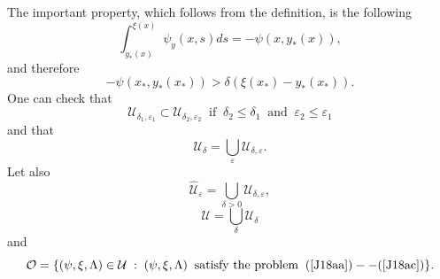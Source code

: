 \documentclass[a4paper,reqno,12pt]{amsart}
\theoremstyle{plain}
\theoremstyle{definition}
\numberwithin{equation}{section}
\begin{document}
\medskip
The important property, which follows from the definition, is the following
\begin{equation}\label{Jun14a}
\int_{y_*(x)}^{\xi(x)}\psi_y(x,s)ds=-\psi(x,y_*(x)),
\end{equation}
and therefore
\begin{equation}\label{Jun14aa}
-\psi(x_*,y_*(x_*))>\delta (\xi(x_*)-y_*(x_*)).
\end{equation}
One can check that
$$
{\mathcal U}_{\delta_1,\varepsilon_1}\subset {\mathcal U}_{\delta_2,\varepsilon_2}\;\;\mbox{if}\;\;\delta_2\leq \delta_1\;\;\mbox{and}\;\;\varepsilon_2\leq\varepsilon_1
$$
and that
\begin{equation}\label{Jun10b}
{\mathcal U}_\delta=\bigcup_\varepsilon {\mathcal U}_{\delta,\varepsilon}.
\end{equation}
Let also
$$
\widehat{\mathcal U}_{\varepsilon}=\bigcup_{\delta>0}{\mathcal U}_{\delta,\varepsilon},
$$
\begin{equation}\label{A30b}
{\mathcal U}=\bigcup_\delta {\mathcal U}_\delta
\end{equation}
and
\begin{equation}\label{A30ba}
{\mathcal O}=\{(\psi,\xi,\Lambda)\in {\mathcal U}\;:\; (\psi,\xi,\Lambda)\;\;
\mbox{satisfy the problem}\;\; (\ref{J18aa})--(\ref{J18ac})\}.
\end{equation}
\end{document}
